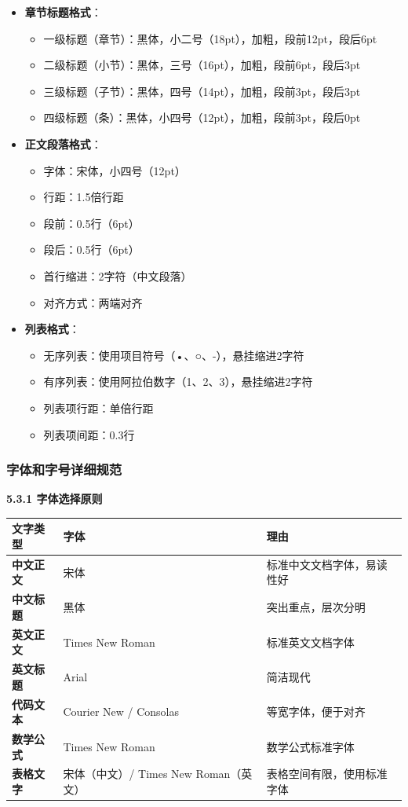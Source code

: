 \documentclass[12pt,a4paper]{article}
\numberwithin{equation}{section}  %
\begin{document}
\begin{itemize}
\item \textbf{章节标题格式}：
\begin{itemize}
\item 一级标题（章节）：黑体，小二号（18pt），加粗，段前12pt，段后6pt
\item 二级标题（小节）：黑体，三号（16pt），加粗，段前6pt，段后3pt
\item 三级标题（子节）：黑体，四号（14pt），加粗，段前3pt，段后3pt
\item 四级标题（条）：黑体，小四号（12pt），加粗，段前3pt，段后0pt

\end{itemize}
\item \textbf{正文段落格式}：
\begin{itemize}
\item 字体：宋体，小四号（12pt）
\item 行距：1.5倍行距
\item 段前：0.5行（6pt）
\item 段后：0.5行（6pt）
\item 首行缩进：2字符（中文段落）
\item 对齐方式：两端对齐

\end{itemize}
\item \textbf{列表格式}：
\begin{itemize}
\item 无序列表：使用项目符号（•、○、-），悬挂缩进2字符
\item 有序列表：使用阿拉伯数字（1、2、3），悬挂缩进2字符
\item 列表项行距：单倍行距
\item 列表项间距：0.3行
\end{itemize}
\end{itemize}

\subsubsection{字体和字号详细规范}
\textbf{5.3.1 字体选择原则}

\begin{longtable}{|p{4cm}|p{5cm}|p{5cm}|}
\hline
文字类型 & 字体 & 理由 \\
\hline
\textbf{中文正文} & 宋体 & 标准中文文档字体，易读性好 \\
\textbf{中文标题} & 黑体 & 突出重点，层次分明 \\
\textbf{英文正文} & Times New Roman & 标准英文文档字体 \\
\textbf{英文标题} & Arial & 简洁现代 \\
\textbf{代码文本} & Courier New / Consolas & 等宽字体，便于对齐 \\
\textbf{数学公式} & Times New Roman & 数学公式标准字体 \\
\textbf{表格文字} & 宋体（中文）/ Times New Roman（英文） & 表格空间有限，使用标准字体 \\
\hline
\end{longtable}
\end{document}
